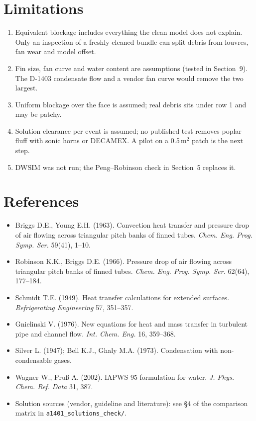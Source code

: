 \documentclass[11pt,a4paper]{article}
\begin{document}
\section{Limitations}
\begin{enumerate}
\item Equivalent blockage includes everything the clean model does not explain. Only an inspection of a freshly cleaned bundle can split debris from louvres, fan wear and model offset.
\item Fin size, fan curve and water content are assumptions (tested in Section~9). The D-1403 condensate flow and a vendor fan curve would remove the two largest.
\item Uniform blockage over the face is assumed; real debris sits under row 1 and may be patchy.
\item Solution clearance per event is assumed; no published test removes poplar fluff with sonic horns or DECAMEX. A pilot on a 0.5\,m$^2$ patch is the next step.
\item DWSIM was not run; the Peng--Robinson check in Section~5 replaces it.
\end{enumerate}

\section*{References}
\begin{itemize}
\item Briggs D.E., Young E.H. (1963). Convection heat transfer and pressure drop of air flowing across triangular pitch banks of finned tubes. \emph{Chem. Eng. Prog. Symp. Ser.} 59(41), 1--10.
\item Robinson K.K., Briggs D.E. (1966). Pressure drop of air flowing across triangular pitch banks of finned tubes. \emph{Chem. Eng. Prog. Symp. Ser.} 62(64), 177--184.
\item Schmidt T.E. (1949). Heat transfer calculations for extended surfaces. \emph{Refrigerating Engineering} 57, 351--357.
\item Gnielinski V. (1976). New equations for heat and mass transfer in turbulent pipe and channel flow. \emph{Int. Chem. Eng.} 16, 359--368.
\item Silver L. (1947); Bell K.J., Ghaly M.A. (1973). Condensation with non-condensable gases.
\item Wagner W., Pru\ss{} A. (2002). IAPWS-95 formulation for water. \emph{J. Phys. Chem. Ref. Data} 31, 387.
\item Solution sources (vendor, guideline and literature): see \S4 of the comparison matrix in \texttt{a1401\_solutions\_check/}.
\end{itemize}
\end{document}
